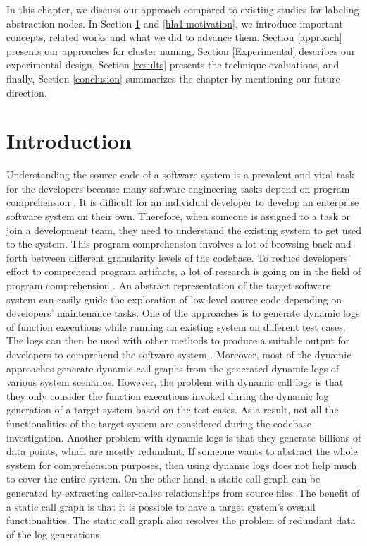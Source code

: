 \label{chapter:hla1}

In this chapter, we discuss our approach compared to existing studies for labeling abstraction nodes. In Section \ref{hla1:intro} and \ref{hla1:motivation}, we introduce important concepts, related works and what we did to advance them. Section \ref{approach} presents our approaches for cluster naming, Section \ref{Experimental} describes our experimental design, 
Section \ref{results} presents the technique evaluations,
and finally, Section \ref{conclusion} summarizes the chapter by mentioning our future direction.  


\section{Introduction}
\label{hla1:intro}
Understanding the source code of a software system is a prevalent and vital task for the developers because many software engineering tasks depend on program comprehension \cite{cornelissen2009systematic, gilmore1991models, xie2016revisit, feng2018hierarchicalExecutionComprehension}. It is difficult for an individual developer to develop an enterprise software system on their own. Therefore, when someone is assigned to a task or join a development team, they need to understand the existing system to get used to the system. This program comprehension involves a lot of browsing back-and-forth between different granularity levels of the codebase. To reduce developers' effort to comprehend program artifacts, a lot of research is going on in the field of program comprehension \cite{feng2018hierarchicalExecutionComprehension, gharibi2018automaticStaticCluster, kulkarni2014supporting, izu2019program}. An abstract representation of the target software system can easily guide the exploration of low-level source code depending on developers' maintenance tasks. One of the approaches is to generate dynamic logs of function executions while running an existing system on different test cases. The logs can then be used with other methods to produce a suitable output for developers to comprehend the software system \cite{feng2018hierarchicalExecutionComprehension}.
Moreover, most of the dynamic approaches generate dynamic call graphs from the generated dynamic logs of various system scenarios. However, the problem with dynamic call logs is that they only consider the function executions invoked during the dynamic log generation of a target system based on the test cases. As a result, not all the functionalities of the target system are considered during the codebase investigation. Another problem with dynamic logs is that they generate billions of data points, which are mostly redundant. If someone wants to abstract the whole system for comprehension purposes, then using dynamic logs does not help much to cover the entire system.
On the other hand, a static call-graph can be generated by extracting caller-callee relationships from source files. The benefit of a static call graph is that it is possible to have a target system's overall functionalities. The static call graph also resolves the problem of redundant data of the log generations.




